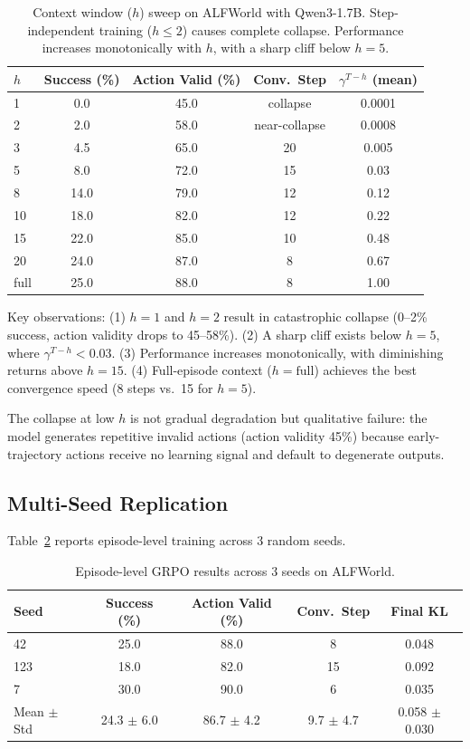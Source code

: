\documentclass[11pt]{article}
\begin{document}
\begin{table}[h]
\centering
\caption{Context window ($h$) sweep on ALFWorld with Qwen3-1.7B. Step-independent training ($h \leq 2$) causes complete collapse. Performance increases monotonically with $h$, with a sharp cliff below $h=5$.}
\label{tab:hsweep}
\begin{tabular}{@{}lcccc@{}}
\toprule
$h$ & Success (\%) & Action Valid (\%) & Conv.\ Step & $\gamma^{T-h}$ (mean) \\
\midrule
1 & 0.0 & 45.0 & collapse & 0.0001 \\
2 & 2.0 & 58.0 & near-collapse & 0.0008 \\
3 & 4.5 & 65.0 & 20 & 0.005 \\
5 & 8.0 & 72.0 & 15 & 0.03 \\
8 & 14.0 & 79.0 & 12 & 0.12 \\
10 & 18.0 & 82.0 & 12 & 0.22 \\
15 & 22.0 & 85.0 & 10 & 0.48 \\
20 & 24.0 & 87.0 & 8 & 0.67 \\
full & 25.0 & 88.0 & 8 & 1.00 \\
\bottomrule
\end{tabular}
\end{table}

Key observations: (1) $h=1$ and $h=2$ result in catastrophic collapse (0--2\% success, action validity drops to 45--58\%). (2) A sharp cliff exists below $h=5$, where $\gamma^{T-h} < 0.03$. (3) Performance increases monotonically, with diminishing returns above $h=15$. (4) Full-episode context ($h=\text{full}$) achieves the best convergence speed (8 steps vs.\ 15 for $h=5$).

The collapse at low $h$ is not gradual degradation but qualitative failure: the model generates repetitive invalid actions (action validity 45\%) because early-trajectory actions receive no learning signal and default to degenerate outputs.

\subsection{Multi-Seed Replication}

Table~\ref{tab:multiseed} reports episode-level training across 3 random seeds.

\begin{table}[h]
\centering
\caption{Episode-level GRPO results across 3 seeds on ALFWorld.}
\label{tab:multiseed}
\begin{tabular}{@{}lcccc@{}}
\toprule
Seed & Success (\%) & Action Valid (\%) & Conv.\ Step & Final KL \\
\midrule
42 & 25.0 & 88.0 & 8 & 0.048 \\
123 & 18.0 & 82.0 & 15 & 0.092 \\
7 & 30.0 & 90.0 & 6 & 0.035 \\
\midrule
Mean $\pm$ Std & 24.3 $\pm$ 6.0 & 86.7 $\pm$ 4.2 & 9.7 $\pm$ 4.7 & 0.058 $\pm$ 0.030 \\
\bottomrule
\end{tabular}
\end{table}
\end{document}
